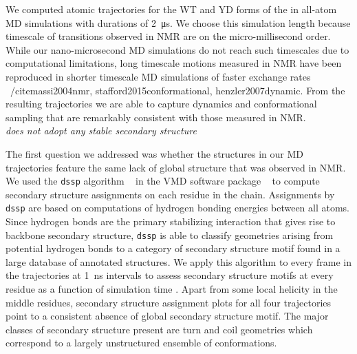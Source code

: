 We computed atomic trajectories for the WT and YD forms of the \gct in all-atom MD simulations with durations of \SI{2}{\us}. We choose this simulation length because timescale of transitions observed in NMR are on the micro-millisecond order. While our nano-microsecond MD simulations do not reach such timescales due to computational limitations, long timescale motions measured in NMR have been reproduced in shorter timescale MD simulations of faster exchange rates ~/cite{massi2004nmr, stafford2015conformational, henzler2007dynamic}. From the resulting trajectories we are able to capture dynamics and conformational sampling that are remarkably consistent with those measured in NMR.\\


{\it \gct does not adopt any stable secondary structure}

The first question we addressed was whether the structures in our MD trajectories feature the same lack of global structure that was observed in NMR. We used the \texttt{dssp} algorithm ~\cite{kabsch1983dictionary} in the VMD software package ~\cite{humphrey1996vmd} to compute secondary structure assignments on each residue in the chain. Assignments by \texttt{dssp} are based on computations of hydrogen bonding energies between all atoms. Since hydrogen bonds are the primary stabilizing interaction that gives rise to backbone secondary structure, \texttt{dssp} is able to classify geometries arising from potential hydrogen bonds to a category of secondary structure motif found in a large database of annotated structures. We apply this algorithm to every frame in the trajectories at \SI{1}{\ns} intervals to assess secondary structure motifs at every residue as a function of simulation time . Apart from some local helicity in the middle residues, secondary structure assignment plots for all four trajectories point to a consistent absence of global secondary structure motif. The major classes of secondary structure present are turn and coil geometries which correspond to a largely unstructured ensemble of conformations. 

\begin{figure}
	\centering     %
	\subfigure[WT]{\label{fig:ss_a}\texttt{[image: wt\_ss]}}
	\subfigure[YD]{\label{fig:ss_b}\texttt{[image: yd\_ss]}}
	\label{fig:ss}
\end{figure}	


